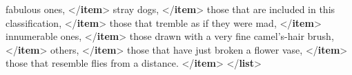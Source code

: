 \begin{shaded}
fabulous ones, {</\textbf{item}>}\mbox{}\newline 
{}stray dogs, {</\textbf{item}>}\mbox{}\newline 
{}those that are included in this classification, {</\textbf{item}>}\mbox{}\newline 
{}those that tremble as if they were mad, {</\textbf{item}>}\mbox{}\newline 
{}innumerable ones, {</\textbf{item}>}\mbox{}\newline 
{}those drawn with a very fine camel's-hair brush, {</\textbf{item}>}\mbox{}\newline 
{}others, {</\textbf{item}>}\mbox{}\newline 
{}those that have just broken a flower vase, {</\textbf{item}>}\mbox{}\newline 
{}those that resemble flies from a distance. {</\textbf{item}>}\mbox{}\newline 
{</\textbf{list}>}\end{shaded}\egroup\par \par
